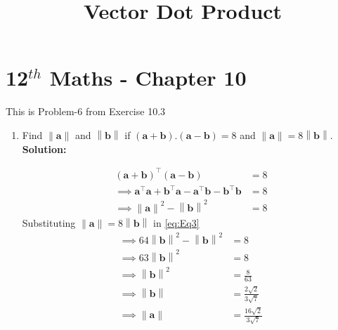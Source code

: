 \documentclass[12pt]{article}
\providecommand{\brak}[1]{\ensuremath{\left(#1\right)}}
\providecommand{\norm}[1]{\left\lVert#1\right\rVert}
\newcommand{\solution}{\noindent \textbf{Solution: }}
\let\vec\mathbf
\begin{document}
\begin{center}
\title{\textbf{Vector Dot Product}}
\date{\vspace{-5ex}} %
\maketitle
\end{center}
\setcounter{page}{1}

\section{12$^{th}$ Maths - Chapter 10}
This is Problem-6 from Exercise 10.3
\begin{enumerate}
\item Find $\norm{\vec{a}}$ and $\norm{\vec{b}}$ if 
$\brak{\vec{a}+\vec{b}}.\brak{\vec{a}-\vec{b}} = 8$ 
and $\norm{\vec{a}}=8\norm{\vec{b}}$.\\
\solution 

  \label{eq:det2f}
\begin{align}
  \brak{\vec{a}+\vec{b}}^\top\brak{\vec{a}-\vec{b}} &= 8\\
  \label{eq:Eq1}
  \implies \vec{a}^\top\vec{a} + \vec{b}^\top\vec{a} - \vec{a}^\top\vec{b} - \vec{b}^\top\vec{b} &= 8\\
  \label{eq:Eq2}
  \implies \norm{\vec{a}}^{2} - \norm{\vec{b}}^{2} &= 8
  \label{eq:Eq3}
\end{align}
\text Substituting $\norm{\vec{a}}=8\norm{\vec{b}}$ in \eqref{eq:Eq3}
\begin{align}
  \implies 64\norm{\vec{b}}^{2} - \norm{\vec{b}}^{2} &= 8 \\
  \label{eq:Eq4}
  \implies 63\norm{\vec{b}}^{2} &= 8 \\
  \label{eq:Eq5}
  \implies \norm{\vec{b}}^{2} &= \frac{8}{63} \\
  \label{eq:Eq6}
  \implies \norm{\vec{b}} &= \frac{2\sqrt{2}}{3\sqrt{7}}\\
  \label{eq:Eq7}
  \implies \norm{\vec{a}} &= \frac{16\sqrt{2}}{3\sqrt{7}}
  \label{eq:Eq8}
\end{align}
\end{enumerate}
\end{document}
